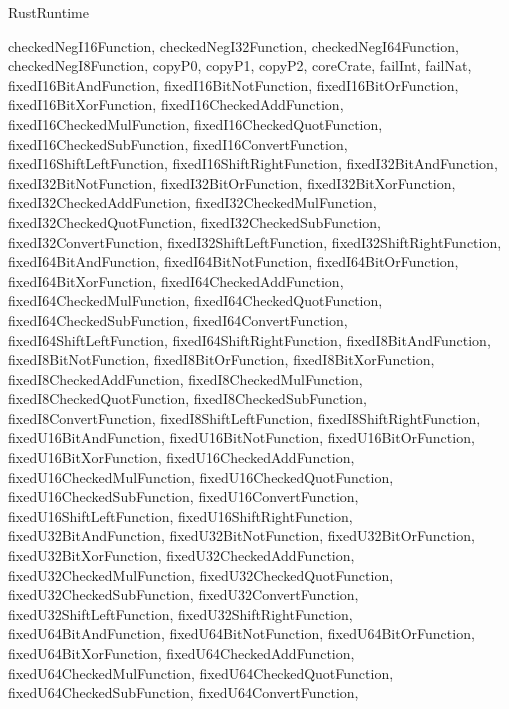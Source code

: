 \begin{lexlean}{RustRuntime}
\begin{semanticmodule}
{{      checkedNegI16Function,
      checkedNegI32Function,
      checkedNegI64Function,
      checkedNegI8Function,
      copyP0,
      copyP1,
      copyP2,
      coreCrate,
      failInt,
      failNat,
      fixedI16BitAndFunction,
      fixedI16BitNotFunction,
      fixedI16BitOrFunction,
      fixedI16BitXorFunction,
      fixedI16CheckedAddFunction,
      fixedI16CheckedMulFunction,
      fixedI16CheckedQuotFunction,
      fixedI16CheckedSubFunction,
      fixedI16ConvertFunction,
      fixedI16ShiftLeftFunction,
      fixedI16ShiftRightFunction,
      fixedI32BitAndFunction,
      fixedI32BitNotFunction,
      fixedI32BitOrFunction,
      fixedI32BitXorFunction,
      fixedI32CheckedAddFunction,
      fixedI32CheckedMulFunction,
      fixedI32CheckedQuotFunction,
      fixedI32CheckedSubFunction,
      fixedI32ConvertFunction,
      fixedI32ShiftLeftFunction,
      fixedI32ShiftRightFunction,
      fixedI64BitAndFunction,
      fixedI64BitNotFunction,
      fixedI64BitOrFunction,
      fixedI64BitXorFunction,
      fixedI64CheckedAddFunction,
      fixedI64CheckedMulFunction,
      fixedI64CheckedQuotFunction,
      fixedI64CheckedSubFunction,
      fixedI64ConvertFunction,
      fixedI64ShiftLeftFunction,
      fixedI64ShiftRightFunction,
      fixedI8BitAndFunction,
      fixedI8BitNotFunction,
      fixedI8BitOrFunction,
      fixedI8BitXorFunction,
      fixedI8CheckedAddFunction,
      fixedI8CheckedMulFunction,
      fixedI8CheckedQuotFunction,
      fixedI8CheckedSubFunction,
      fixedI8ConvertFunction,
      fixedI8ShiftLeftFunction,
      fixedI8ShiftRightFunction,
      fixedU16BitAndFunction,
      fixedU16BitNotFunction,
      fixedU16BitOrFunction,
      fixedU16BitXorFunction,
      fixedU16CheckedAddFunction,
      fixedU16CheckedMulFunction,
      fixedU16CheckedQuotFunction,
      fixedU16CheckedSubFunction,
      fixedU16ConvertFunction,
      fixedU16ShiftLeftFunction,
      fixedU16ShiftRightFunction,
      fixedU32BitAndFunction,
      fixedU32BitNotFunction,
      fixedU32BitOrFunction,
      fixedU32BitXorFunction,
      fixedU32CheckedAddFunction,
      fixedU32CheckedMulFunction,
      fixedU32CheckedQuotFunction,
      fixedU32CheckedSubFunction,
      fixedU32ConvertFunction,
      fixedU32ShiftLeftFunction,
      fixedU32ShiftRightFunction,
      fixedU64BitAndFunction,
      fixedU64BitNotFunction,
      fixedU64BitOrFunction,
      fixedU64BitXorFunction,
      fixedU64CheckedAddFunction,
      fixedU64CheckedMulFunction,
      fixedU64CheckedQuotFunction,
      fixedU64CheckedSubFunction,
      fixedU64ConvertFunction,
}}
\end{semanticmodule}
\end{lexlean}
